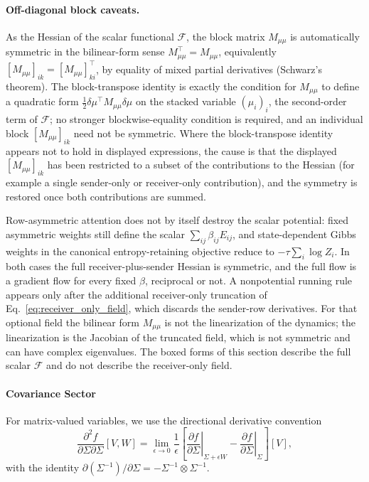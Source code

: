 \paragraph{Off-diagonal block caveats.}\label{sec:mass_block_caveats}
As the Hessian of the scalar functional $\mathcal{F}$, the block matrix $M_{\mu\mu}$ is automatically symmetric in the bilinear-form sense $M_{\mu\mu}^\top = M_{\mu\mu}$, equivalently $[M_{\mu\mu}]_{ik} = [M_{\mu\mu}]_{ki}^\top$, by equality of mixed partial derivatives (Schwarz's theorem). The block-transpose identity is exactly the condition for $M_{\mu\mu}$ to define a quadratic form $\tfrac12 \delta\mu^\top M_{\mu\mu} \delta\mu$ on the stacked variable $(\mu_i)_i$, the second-order term of $\mathcal{F}$; no stronger blockwise-equality condition is required, and an individual block $[M_{\mu\mu}]_{ik}$ need not be symmetric. Where the block-transpose identity appears not to hold in displayed expressions, the cause is that the displayed $[M_{\mu\mu}]_{ik}$ has been restricted to a subset of the contributions to the Hessian (for example a single sender-only or receiver-only contribution), and the symmetry is restored once both contributions are summed.

Row-asymmetric attention does not by itself destroy the scalar potential: fixed asymmetric weights still define the scalar $\sum_{ij}\beta_{ij}E_{ij}$, and state-dependent Gibbs weights in the canonical entropy-retaining objective reduce to $-\tau\sum_i\log Z_i$. In both cases the full receiver-plus-sender Hessian is symmetric, and the full flow is a gradient flow for every fixed $\beta$, reciprocal or not. A nonpotential running rule appears only after the additional receiver-only truncation of Eq.~\eqref{eq:receiver_only_field}, which discards the sender-row derivatives. For that optional field the bilinear form $M_{\mu\mu}$ is not the linearization of the dynamics; the linearization is the Jacobian of the truncated field, which is not symmetric and can have complex eigenvalues. The boxed forms of this section describe the full scalar $\mathcal{F}$ and do not describe the receiver-only field.

\paragraph{Covariance Sector}

For matrix-valued variables, we use the directional derivative convention
\begin{equation}
\frac{\partial^2 f}{\partial \Sigma \partial \Sigma}[V, W] = \lim_{\epsilon \to 0} \frac{1}{\epsilon}\left[\left.\frac{\partial f}{\partial \Sigma}\right|_{\Sigma + \epsilon W} - \left.\frac{\partial f}{\partial \Sigma}\right|_{\Sigma}\right][V],
\end{equation}
with the identity $\partial(\Sigma^{-1})/\partial \Sigma = -\Sigma^{-1} \otimes \Sigma^{-1}$.

